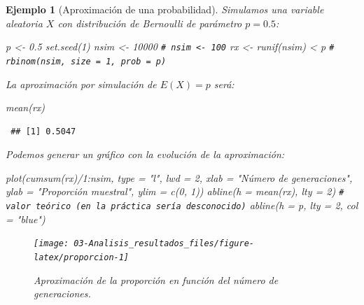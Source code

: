 \documentclass[
  10pt,
]{book}
\newenvironment{Shaded}{\begin{snugshade}}{\end{snugshade}}
\newcommand{\AttributeTok}[1]{\textcolor[rgb]{0.77,0.63,0.00}{#1}}
\newcommand{\CommentTok}[1]{\textcolor[rgb]{0.56,0.35,0.01}{\textit{#1}}}
\newcommand{\DecValTok}[1]{\textcolor[rgb]{0.00,0.00,0.81}{#1}}
\newcommand{\FloatTok}[1]{\textcolor[rgb]{0.00,0.00,0.81}{#1}}
\newcommand{\FunctionTok}[1]{\textcolor[rgb]{0.00,0.00,0.00}{#1}}
\newcommand{\NormalTok}[1]{#1}
\newcommand{\OtherTok}[1]{\textcolor[rgb]{0.56,0.35,0.01}{#1}}
\newcommand{\SpecialCharTok}[1]{\textcolor[rgb]{0.00,0.00,0.00}{#1}}
\newcommand{\StringTok}[1]{\textcolor[rgb]{0.31,0.60,0.02}{#1}}
\theoremstyle{break}
\newtheorem{example}{Ejemplo}[chapter]
\theoremstyle{nonumberplain}
\renewcommand{\CommentTok}[1]{\textcolor[rgb]{0.41,0.41,0.41}{\texttt{#1}}}
\begin{document}
\begin{example}[Aproximación de una probabilidad]

Simulamos una variable aleatoria \(X\) con distribución de Bernoulli de parámetro \(p=0.5\):

\begin{Shaded}
\begin{Highlighting}[]
\NormalTok{p }\OtherTok{\textless{}{-}} \FloatTok{0.5}
\FunctionTok{set.seed}\NormalTok{(}\DecValTok{1}\NormalTok{)}
\NormalTok{nsim }\OtherTok{\textless{}{-}} \DecValTok{10000} \CommentTok{\# nsim \textless{}{-} 100}
\NormalTok{rx }\OtherTok{\textless{}{-}} \FunctionTok{runif}\NormalTok{(nsim) }\SpecialCharTok{\textless{}}\NormalTok{ p }\CommentTok{\# rbinom(nsim, size = 1, prob = p)}
\end{Highlighting}
\end{Shaded}

La aproximación por simulación de \(E(X) = p\) será:

\begin{Shaded}
\begin{Highlighting}[]
\FunctionTok{mean}\NormalTok{(rx) }
\end{Highlighting}
\end{Shaded}

\begin{verbatim}
 ## [1] 0.5047
\end{verbatim}

Podemos generar un gráfico con la evolución de la aproximación:

\begin{Shaded}
\begin{Highlighting}[]
\FunctionTok{plot}\NormalTok{(}\FunctionTok{cumsum}\NormalTok{(rx)}\SpecialCharTok{/}\DecValTok{1}\SpecialCharTok{:}\NormalTok{nsim, }\AttributeTok{type =} \StringTok{"l"}\NormalTok{, }\AttributeTok{lwd =} \DecValTok{2}\NormalTok{, }\AttributeTok{xlab =} \StringTok{"Número de generaciones"}\NormalTok{, }
     \AttributeTok{ylab =} \StringTok{"Proporción muestral"}\NormalTok{, }\AttributeTok{ylim =} \FunctionTok{c}\NormalTok{(}\DecValTok{0}\NormalTok{, }\DecValTok{1}\NormalTok{))}
\FunctionTok{abline}\NormalTok{(}\AttributeTok{h =} \FunctionTok{mean}\NormalTok{(rx), }\AttributeTok{lty =} \DecValTok{2}\NormalTok{)}
\CommentTok{\# valor teórico (en la práctica sería desconocido)}
\FunctionTok{abline}\NormalTok{(}\AttributeTok{h =}\NormalTok{ p, }\AttributeTok{lty =} \DecValTok{2}\NormalTok{, }\AttributeTok{col =} \StringTok{"blue"}\NormalTok{) }
\end{Highlighting}
\end{Shaded}

\begin{figure}[!htbp]

{\centering \texttt{[image: 03-Analisis\_resultados\_files/figure-latex/proporcion-1]} 

}

\caption{Aproximación de la proporción en función del número de generaciones.}\label{fig:proporcion}
\end{figure}

\end{example}
\end{document}
